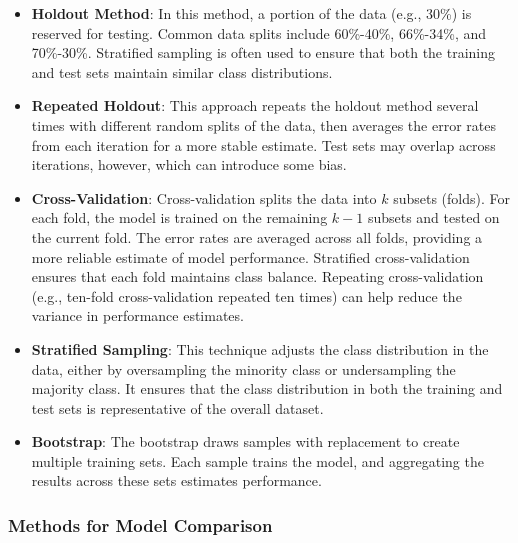 \begin{itemize}
    \item \textbf{Holdout Method}: In this method, a portion of the data (e.g., 30\%) is reserved for testing. Common data splits include 60\%-40\%, 66\%-34\%, and 70\%-30\%. Stratified sampling is often used to ensure that both the training and test sets maintain similar class distributions.
    
    \item \textbf{Repeated Holdout}: This approach repeats the holdout method several times with different random splits of the data, then averages the error rates from each iteration for a more stable estimate. Test sets may overlap across iterations, however, which can introduce some bias.
    
    \item \textbf{Cross-Validation}: Cross-validation splits the data into $k$ subsets (folds). For each fold, the model is trained on the remaining $k-1$ subsets and tested on the current fold. The error rates are averaged across all folds, providing a more reliable estimate of model performance. Stratified cross-validation ensures that each fold maintains class balance. Repeating cross-validation (e.g., ten-fold cross-validation repeated ten times) can help reduce the variance in performance estimates.
    
    \item \textbf{Stratified Sampling}: This technique adjusts the class distribution in the data, either by oversampling the minority class or undersampling the majority class. It ensures that the class distribution in both the training and test sets is representative of the overall dataset.
    
    \item \textbf{Bootstrap}: The bootstrap draws samples with replacement to create multiple training sets. Each sample trains the model, and aggregating the results across these sets estimates performance.
\end{itemize}


\subsubsection{Methods for Model Comparison}

